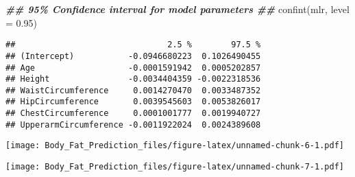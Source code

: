\documentclass[
]{article}
\newenvironment{Shaded}{\begin{snugshade}}{\end{snugshade}}
\newcommand{\AttributeTok}[1]{\textcolor[rgb]{0.77,0.63,0.00}{#1}}
\newcommand{\DocumentationTok}[1]{\textcolor[rgb]{0.56,0.35,0.01}{\textbf{\textit{#1}}}}
\newcommand{\FloatTok}[1]{\textcolor[rgb]{0.00,0.00,0.81}{#1}}
\newcommand{\FunctionTok}[1]{\textcolor[rgb]{0.00,0.00,0.00}{#1}}
\newcommand{\NormalTok}[1]{#1}
\newcommand{\SpecialCharTok}[1]{\textcolor[rgb]{0.00,0.00,0.00}{#1}}
\newcommand{\StringTok}[1]{\textcolor[rgb]{0.31,0.60,0.02}{#1}}
\begin{document}
\begin{Shaded}
\begin{Highlighting}[]
\DocumentationTok{\#\# 95\% Confidence interval for model parameters \#\#}
\FunctionTok{confint}\NormalTok{(mlr, }\AttributeTok{level =} \FloatTok{0.95}\NormalTok{)}
\end{Highlighting}
\end{Shaded}

\begin{verbatim}
##                               2.5 %        97.5 %
## (Intercept)           -0.0946680223  0.1026490455
## Age                   -0.0001591942  0.0005202857
## Height                -0.0034404359 -0.0022318536
## WaistCircumference     0.0014270470  0.0033487352
## HipCircumference       0.0039545603  0.0053826017
## ChestCircumference     0.0001001777  0.0019940727
## UpperarmCircumference -0.0011922024  0.0024389608
\end{verbatim}

\begin{Shaded}
\end{Shaded}

\texttt{[image: Body\_Fat\_Prediction\_files/figure-latex/unnamed-chunk-6-1.pdf]}

\begin{Shaded}
\end{Shaded}

\texttt{[image: Body\_Fat\_Prediction\_files/figure-latex/unnamed-chunk-7-1.pdf]}

\begin{Shaded}
\end{Shaded}
\end{document}

